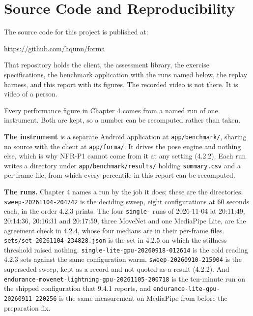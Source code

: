 \chapter{Source Code and Reproducibility}
\label{app:source-code}

The source code for this project is published at:

\begin{center}
\url{https://github.com/hqunn/forma}
\end{center}

\noindent That repository holds the client, the assessment library, the
exercise specifications, the benchmark application with the runs named
below, the replay harness, and this report with its figures. The recorded
video is not there. It is video of a person.

Every performance figure in Chapter 4 comes from a named run of one
instrument. Both are kept, so a number can be recomputed rather than taken.

\textbf{The instrument} is a separate Android application at
\texttt{app/\allowbreak{}benchmark/}, sharing no source with the client at
\texttt{app/\allowbreak{}forma/}. It drives the pose engine and nothing else,
which is why NFR-P1 cannot come from it at any setting (4.2.2). Each run
writes a directory under
\texttt{app/\allowbreak{}benchmark/\allowbreak{}results/} holding
\texttt{summary.csv} and a per-frame file, from which every percentile
in this report can be recomputed.

\textbf{The runs.} Chapter 4 names a run by the job it does; these are the directories.
\texttt{sweep-\allowbreak{}20261104-\allowbreak{}204742} is the deciding
sweep, eight configurations at 60 seconds each, in the order 4.2.3 prints. The four \texttt{single-} runs of 2026-11-04 at 20:11:49, 20:14:36,
20:16:31 and 20:17:59, three MoveNet and one MediaPipe Lite, are the
agreement check in 4.2.4, whose four medians are in their per-frame files.
\texttt{sets/\allowbreak{}set-\allowbreak{}20261104-\allowbreak{}234828.json}
is the set in 4.2.5 on which the stillness threshold raised nothing.
\texttt{single-\allowbreak{}lite-\allowbreak{}gpu-\allowbreak{}20260918-\allowbreak{}012614}
is the cold reading 4.2.3 sets against the same configuration warm.
\texttt{sweep-\allowbreak{}20260910-\allowbreak{}215904} is the superseded
sweep, kept as a record and not quoted as a result (4.2.2). And
\texttt{endurance-\allowbreak{}movenet-\allowbreak{}lightning-\allowbreak{}gpu-\allowbreak{}20261105-\allowbreak{}200718}
is the ten-minute run on the shipped configuration that 9.4.1 reports, and
\texttt{endurance-\allowbreak{}lite-\allowbreak{}gpu-\allowbreak{}20260911-\allowbreak{}220256}
is the same measurement on MediaPipe from before the preparation fix.

